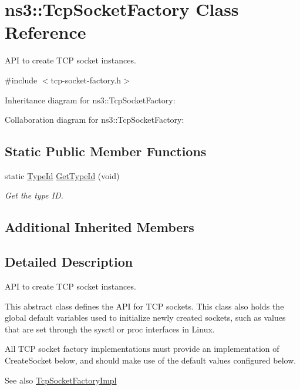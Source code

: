 \hypertarget{classns3_1_1TcpSocketFactory}{}\section{ns3\+:\+:Tcp\+Socket\+Factory Class Reference}
\label{classns3_1_1TcpSocketFactory}


A\+PI to create T\+CP socket instances.  




{\ttfamily \#include $<$tcp-\/socket-\/factory.\+h$>$}



Inheritance diagram for ns3\+:\+:Tcp\+Socket\+Factory\+:


Collaboration diagram for ns3\+:\+:Tcp\+Socket\+Factory\+:
\subsection*{Static Public Member Functions}
\begin{DoxyCompactItemize}
\item 
static \hyperlink{classns3_1_1TypeId}{Type\+Id} \hyperlink{classns3_1_1TcpSocketFactory_a29c295f0b282f52d7c903768f80607b0}{Get\+Type\+Id} (void)
\begin{DoxyCompactList}\small\item\em Get the type ID. \end{DoxyCompactList}\end{DoxyCompactItemize}
\subsection*{Additional Inherited Members}


\subsection{Detailed Description}
A\+PI to create T\+CP socket instances. 

This abstract class defines the A\+PI for T\+CP sockets. This class also holds the global default variables used to initialize newly created sockets, such as values that are set through the sysctl or proc interfaces in Linux.

All T\+CP socket factory implementations must provide an implementation of Create\+Socket below, and should make use of the default values configured below.

\begin{DoxySeeAlso}{See also}
\hyperlink{classns3_1_1TcpSocketFactoryImpl}{Tcp\+Socket\+Factory\+Impl} 
\end{DoxySeeAlso}


